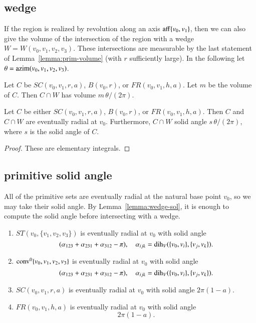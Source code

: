 \subsection{wedge}\label{sec:wedge}

If the region is realized by revolution along an axis ${\operatorname{aff}}\{v_0,v_1\}$, 
then
we can also give the volume of the intersection of the region
with a wedge $W=W(v_0,v_1,v_2,v_3)$.  These intersections are measurable
by the last statement of Lemma~\ref{lemma:prim-volume} (with $r$ sufficiently
large).
  In the following
let $\theta = {\operatorname{azim}}(v_0,v_1,v_2,v_3)$.

\begin{lemma}  Let $C$ be $SC(v_0,v_1,r,a)$, $B(v_0,r)$, or
   $FR(v_0,v_1,h,a)$.  Let $m$ be the volume of $C$.  
   Then $C\cap W$ has volume $m\,\theta/(2\pi)$.   
\end{lemma}

\begin{lemma}  Let $C$ be either $SC(v_0,v_1,r,a)$, $B(v_0,r)$, or
   $FR(v_0,v_1,h,a)$.  Then $C$ and $C\cap W$ are eventually 
radial at $v_0$. Furthermore,
    $C\cap W$ solid angle 
  $s\,\theta/(2\pi)$, where $s$ is the solid angle of $C$.
\end{lemma}


\begin{proof}
These are elementary integrals.
\end{proof}


\subsection{primitive solid angle}

All of the primitive sets are eventually radial at the natural
base point $v_0$, so we may take their
solid angle.  By Lemma~\ref{lemma:wedge-sol}, it is enough to compute
the solid angle before intersecting with a wedge.

\begin{lemma} 
\begin{enumerate}
    \item  $ST(v_0,\{v_1,v_2,v_3\})$ is eventually radial at $v_0$
     with solid angle 
     $$
     (\alpha_{123}+\alpha_{231}+\alpha_{312}-\pi),\quad
     \alpha_{ijk}=\operatorname{dih}_V(\{v_0,v_i\},\{v_j,v_k\}).
     $$
    \item ${\operatorname{conv}}^0\{v_0,v_1,v_2,v_3\}$ is eventually radial at $v_0$
      with solid angle
           $$
     (\alpha_{123}+\alpha_{231}+\alpha_{312}-\pi),\quad
     \alpha_{ijk}=\operatorname{dih}_V(\{v_0,v_i\},\{v_j,v_k\}).
     $$
    \item $SC(v_0,v_1,r,a)$ is eventually radial at $v_0$ with solid
      angle 
      $2\pi(1-a)$.
    \item $FR(v_0,v_1,h,a)$ is eventually radial at $v_0$ with solid
      angle
        $$
        2\pi (1-a).
        $$
\end{enumerate}
\end{lemma}

